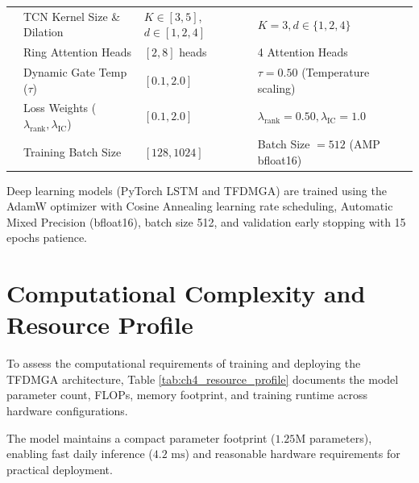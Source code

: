 \begin{table}[H]
{\begin{tabular}{llll}
 & TCN Kernel Size \& Dilation & $K \in [3, 5]$, $d \in [1, 2, 4]$ & $K = 3, d \in \{1, 2, 4\}$ \\
 & Ring Attention Heads & $[2, 8]$ heads & 4 Attention Heads \\
 & Dynamic Gate Temp ($\tau$) & $[0.1, 2.0]$ & $\tau = 0.50$ (Temperature scaling) \\
 & Loss Weights ($\lambda_{\text{rank}}, \lambda_{\operatorname{IC}}$) & $[0.1, 2.0]$ & $\lambda_{\text{rank}} = 0.50, \lambda_{\operatorname{IC}} = 1.0$ \\
 & Training Batch Size & $[128, 1024]$ & Batch Size $= 512$ (AMP bfloat16) \\
\bottomrule
\end{tabular}%
}
\end{table}

Deep learning models (PyTorch LSTM and TFDMGA) are trained using the AdamW optimizer \citep{loshchilov2018decoupled} with Cosine Annealing learning rate scheduling, Automatic Mixed Precision (bfloat16), batch size 512, and validation early stopping with 15 epochs patience.

\section{Computational Complexity and Resource Profile}
\label{sec:ch4_computational_complexity}

To assess the computational requirements of training and deploying the TFDMGA architecture, Table \ref{tab:ch4_resource_profile} documents the model parameter count, FLOPs, memory footprint, and training runtime across hardware configurations.

\begin{table}[H]
\centering
\caption{Computational Complexity, Parameter Count, and Resource Execution Profile}
\label{tab:ch4_resource_profile}
\end{table}

The model maintains a compact parameter footprint ($1.25\text{M}$ parameters), enabling fast daily inference ($4.2\text{ ms}$) and reasonable hardware requirements for practical deployment.
